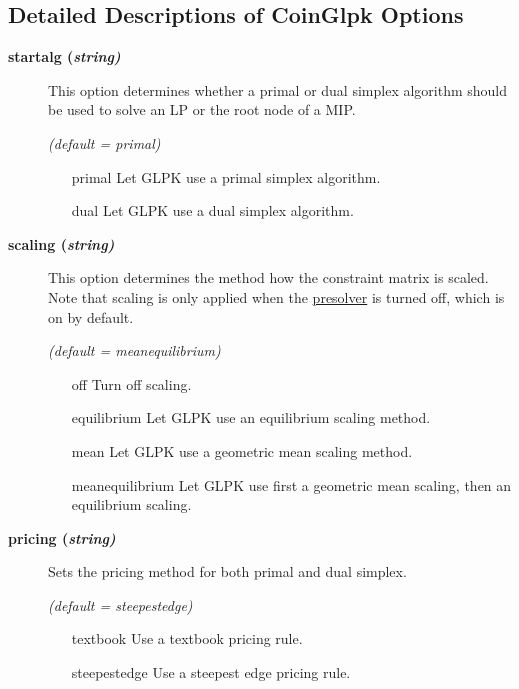 \subsection{Detailed Descriptions of CoinGlpk Options}

\begin{description}

\item[\label{glpkstartalg}\hypertarget{glpkstartalg}
{\textbf{startalg (\slshape{string})}}]\hspace{1.0in}

This option determines whether a primal or dual simplex algorithm should be used to solve an LP or the root node of a MIP.

\textsl{(default = primal)}
\begin{itemize}
\item[primal] 
Let GLPK use a primal simplex algorithm.
\item[dual] 
Let GLPK use a dual simplex algorithm.
\end{itemize}

\item[\label{glpkscaling}\hypertarget{glpkscaling}
{\textbf{scaling (\slshape{string})}}]\hspace{1.0in}

This option determines the method how the constraint matrix is scaled.
Note that scaling is only applied when the \hyperlink{presolve}{presolver} is turned off, which is on by default.

\textsl{(default = meanequilibrium)}
\begin{itemize}
\item[off] 
Turn off scaling.
\item[equilibrium] 
Let GLPK use an equilibrium scaling method.
\item[mean] 
Let GLPK use a geometric mean scaling method.
\item[meanequilibrium] 
Let GLPK use first a geometric mean scaling, then an equilibrium scaling.
\end{itemize}

\item[\label{pricing}\hypertarget{pricing}
{\textbf{pricing (\slshape{string})}}]\hspace{1.0in}

Sets the pricing method for both primal and dual simplex.

\textsl{(default = steepestedge)}
\begin{itemize}
\item[textbook] 
Use a textbook pricing rule.
\item[steepestedge] 
Use a steepest edge pricing rule.
\end{itemize}


\end{description}

